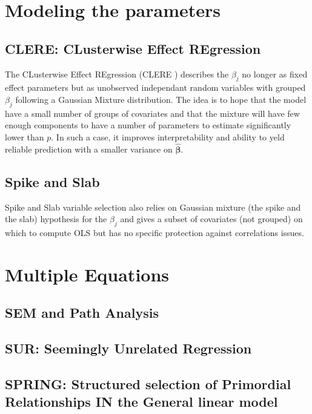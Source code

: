 \documentclass[11pt,a4paper]{report}
\begin{document}
	\section{Modeling the parameters}	
		\subsection{CLERE: CLusterwise Effect REgression}
			\cite{yengo2012variable}%
			The CLusterwise Effect REgression (\textsc{CLERE} \cite{yengo2012variable}) describes the $\beta_j$ no longer as fixed effect parameters but as unobserved independant random variables with grouped $\beta_j$ following a Gaussian Mixture distribution. The idea is to hope that the model have a small number of groups of covariates and that the mixture will have few enough components to have a number of parameters to estimate significantly lower than $p$. In such a case, it improves interpretability and ability to yeld reliable prediction with a smaller variance on $\boldsymbol{\hat{\beta}}$. 
	
		\subsection{Spike and Slab}	
			\cite{ishwaran2005spike}%
			Spike and Slab variable selection \cite{ishwaran2005spike} also relies on Gaussian mixture (the spike and the slab) hypothesis for the $\beta_j$ and gives a subset of covariates (not grouped) on which to compute \textsc{OLS} but has no specific protection against correlations issues.
	\section{Multiple Equations}
		\subsection{SEM and Path Analysis}
		\subsection{SUR: Seemingly Unrelated Regression}
			\cite{SURzellner}
		\subsection{SPRING: Structured selection of Primordial Relationships IN the General linear model}
			\cite{chiquetconf}			
			
\end{document}

